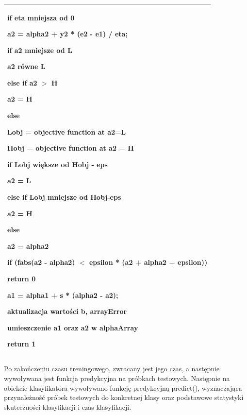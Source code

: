 \documentclass[11pt]{article}
\begin{document}
\begin{enumerate}
\begin{tabular}{|p{11.5cm}|}
\noindent \textbf{if }eta mniejsza od 0

 \hspace{1em}a2 = alpha2 + y2 * (e2 - e1) / eta;

 \hspace{1em}\textbf{if} a2 mniejsze od L

  \hspace{2em}a2 równe L

 \hspace{1em}\textbf{else if} a2 $>$ H

  \hspace{2em}a2 = H

\noindent \textbf{else}

 \hspace{1em}Lobj = objective function at a2=L

\hspace{1em} Hobj = objective function at a2 = H

 \hspace{1em}\textbf{if }Lobj większe od Hobj - eps

  \hspace{2em}a2 = L

 \hspace{1em}\textbf{else if} Lobj mniejsze od Hobj-eps

  \hspace{2em}a2 = H

 \hspace{1em}\textbf{else}

  \hspace{2em}a2 = alpha2

\noindent \textbf{if} (fabs(a2 - alpha2) $<$ epsilon * (a2 + alpha2 + epsilon)) 

  \hspace{1em}return 0

\noindent a1 = alpha1 + s * (alpha2 - a2); 

\noindent aktualizacja wartości b, arrayError

\noindent umieszczenie a1 oraz a2 w alphaArray

\noindent return 1

\noindent \textbf{}
\\ \hline
\end{tabular}

 Po zakończeniu czasu treningowego, zwracany jest jego czas, a następnie wywoływana jest funkcja predykcyjna na próbkach testowych. Następnie na obiekcie klasyfikatora wywoływano funkcję predykcyjną predict(), wyznaczająca przynależność próbek testowych do konkretnej klasy oraz podstawowe statystyki skuteczności klasyfikacji i czas klasyfikacji.


\end{enumerate}
\end{document}
